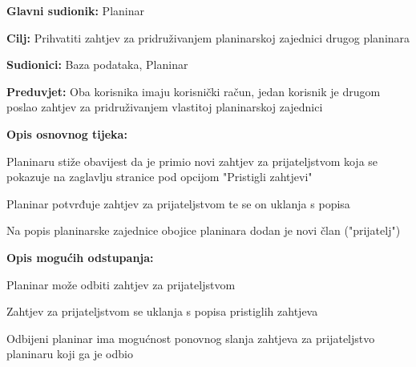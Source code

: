 		\noindent {}
		\begin{packed_item}
			
			\item \textbf{Glavni sudionik: }$ $Planinar$ $
			\item  \textbf{Cilj:} $ $Prihvatiti zahtjev za pridruživanjem planinarskoj zajednici drugog planinara$ $
			\item  \textbf{Sudionici:} $ $Baza podataka, Planinar$ $
			\item  \textbf{Preduvjet:} $ $Oba korisnika imaju korisnički račun, jedan korisnik je drugom poslao zahtjev za pridruživanjem vlastitoj planinarskoj zajednici$ $
			\item  \textbf{Opis osnovnog tijeka:}
			
			\item[] \begin{packed_enum}
				
				\item $ $Planinaru stiže obavijest da je primio novi zahtjev za prijateljstvom koja se pokazuje na zaglavlju stranice pod opcijom "Pristigli zahtjevi"$ $
				\item $ $Planinar potvrđuje zahtjev za prijateljstvom te se on uklanja s popisa$ $
				\item $ $Na popis planinarske zajednice obojice planinara dodan je novi član ("prijatelj")$ $
				
			\end{packed_enum}
			
			\item  \textbf{Opis mogućih odstupanja:}
			
			\item[] \begin{packed_item}
				
				\item[2.a] $ $Planinar može odbiti zahtjev za prijateljstvom $ $
				\item[] \begin{packed_enum}
					
					\item $ $Zahtjev za prijateljstvom se uklanja s popisa pristiglih zahtjeva $ $
					\item $ $Odbijeni planinar ima mogućnost ponovnog slanja zahtjeva za prijateljstvo planinaru koji ga je odbio $ $
					
				\end{packed_enum}
			\end{packed_item}
		\end{packed_item}
	
